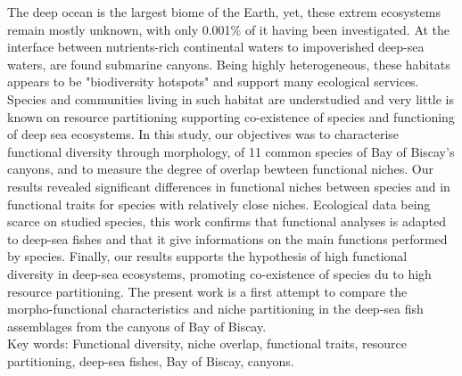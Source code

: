 
The deep ocean is the largest biome of the Earth, yet, these extrem ecosystems remain mostly unknown, with only 0.001\% of it having been investigated. At the interface between nutrients-rich continental waters to impoverished deep-sea waters, are found submarine canyons. Being highly heterogeneous, these habitats appears to be "biodiversity hotspots" and support many ecological services. Species and communities living in such habitat are understudied and very little is known on resource partitioning supporting co-existence of species and functioning of deep sea ecosystems. In this study, our objectives was to characterise functional diversity through morphology, of 11 common species of Bay of Biscay's canyons, and to measure the degree of overlap bewteen functional niches. Our results revealed significant differences in functional niches between species and in functional traits for species with relatively close niches. Ecological data being scarce on studied species, this work confirms that functional analyses is adapted to deep-sea fishes and that it give informations on the main functions performed by species. Finally, our results supports the hypothesis of high functional diversity in deep-sea ecosystems,  promoting co-existence of species du to high resource partitioning. The present work is a first attempt to compare the morpho-functional characteristics and niche partitioning in the deep-sea fish assemblages from the canyons of Bay of Biscay.\\


Key words: Functional diversity, niche overlap, functional traits, resource partitioning, deep-sea fishes, Bay of Biscay, canyons.

